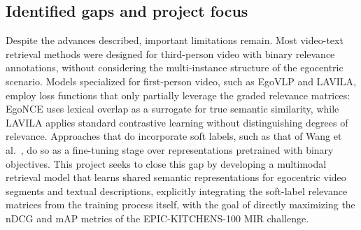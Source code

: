 \subsection*{Identified gaps and project focus}

Despite the advances described, important limitations remain. Most video-text retrieval methods were designed for third-person video with binary relevance annotations, without considering the multi-instance structure of the egocentric scenario. Models specialized for first-person video, such as EgoVLP and LAVILA, employ loss functions that only partially leverage the graded relevance matrices: EgoNCE uses lexical overlap as a surrogate for true semantic similarity, while LAVILA applies standard contrastive learning without distinguishing degrees of relevance. Approaches that do incorporate soft labels, such as that of Wang et al.~\cite{wang2024symmetricmultisimilaritylossepickitchens100}, do so as a fine-tuning stage over representations pretrained with binary objectives. This project seeks to close this gap by developing a multimodal retrieval model that learns shared semantic representations for egocentric video segments and textual descriptions, explicitly integrating the soft-label relevance matrices from the training process itself, with the goal of directly maximizing the nDCG and mAP metrics of the EPIC-KITCHENS-100 MIR challenge.
